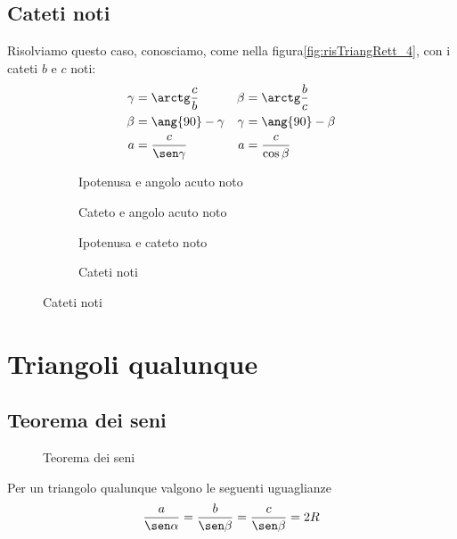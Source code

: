 \subsection{Cateti noti}
Risolviamo questo caso, conosciamo, come nella figura\nobs\vref*{fig:risTriangRett_4}, con i cateti $b$ e $c$ noti:
\begin{align*}
\gamma&=\arctg\dfrac{c}{b}&\beta&=\arctg\dfrac{b}{c}\\
\beta&=\ang{90}-\gamma&\gamma&=\ang{90}-\beta\\
a&=\dfrac{c}{\sen\gamma}&a&=\dfrac{c}{\cos\beta}
\end{align*}
\begin{figure}
	\begin{subfigure}[b]{.5\linewidth}
		\centering

	\caption{Ipotenusa e angolo acuto noto}
	\label{fig:risTriangRett_1}
	\end{subfigure}%
	\begin{subfigure}[b]{.5\linewidth}
		\centering
		
		\caption{Cateto e angolo acuto noto}
		\label{fig:risTriangRett_2}
	\end{subfigure}
	\begin{subfigure}[b]{.5\linewidth}
		\centering
	
	\caption{Ipotenusa e cateto noto}
	\label{fig:risTriangRett_3}
	\end{subfigure}%
	\begin{subfigure}[b]{.5\linewidth}
		\centering
		
		\caption{Cateti noti}
		\label{fig:risTriangRett_4}
	\end{subfigure}
	\label{fig:RisoluzioneTriangoliRettangoli}
\end{figure}
\section{Triangoli qualunque}
\subsection{Teorema dei seni}
\begin{figure}
	\centering
	
	\caption{Teorema dei seni}
	\label{fig:TeoremDeiSeni}
\end{figure}
Per un triangolo qualunque valgono le seguenti uguaglianze\[\dfrac{a}{\sen\alpha}=\dfrac{b}{\sen\beta}=\dfrac{c}{\sen\beta}=2R \]

